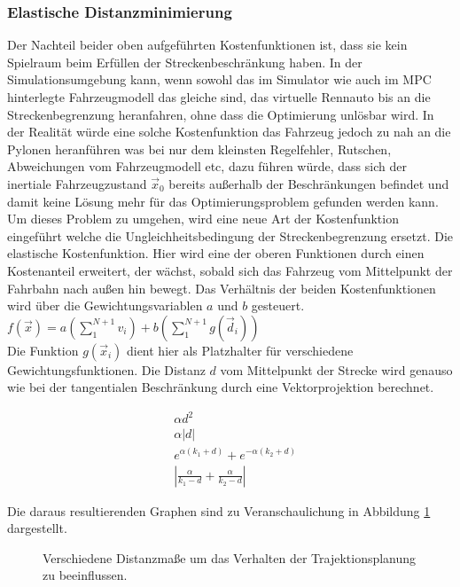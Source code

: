 \documentclass{like}
\begin{document}
\subsubsection*{Elastische Distanzminimierung}
Der Nachteil beider oben aufgeführten Kostenfunktionen ist, dass sie kein Spielraum beim Erfüllen der Streckenbeschränkung haben. In der Simulationsumgebung kann, wenn sowohl das im Simulator wie auch im \ac{MPC} hinterlegte Fahrzeugmodell das gleiche sind, das virtuelle Rennauto bis an die Streckenbegrenzung heranfahren, ohne dass die Optimierung unlösbar wird. In der Realität würde eine solche Kostenfunktion das Fahrzeug jedoch zu nah an die Pylonen heranführen was bei nur dem kleinsten Regelfehler, Rutschen, Abweichungen vom Fahrzeugmodell etc, dazu führen würde, dass sich der inertiale Fahrzeugzustand $\vec{x}_0$ bereits außerhalb der Beschränkungen befindet und damit keine Lösung mehr für das Optimierungsproblem gefunden werden kann. Um dieses Problem zu umgehen, wird eine neue Art der Kostenfunktion eingeführt welche die Ungleichheitsbedingung der Streckenbegrenzung ersetzt. Die elastische Kostenfunktion. Hier wird eine der oberen Funktionen durch einen Kostenanteil erweitert, der wächst, sobald sich das Fahrzeug vom Mittelpunkt der Fahrbahn nach außen hin bewegt. Das Verhältnis der beiden Kostenfunktionen wird über die Gewichtungsvariablen \(a\) und \(b\) gesteuert.\\
$f(\vec{x}) = a (\sum_{1}^{N+1} v_i) + b(\sum_{1}^{N+1} g(\vec{d}_i))$  \\
Die Funktion $g(\vec{x}_i)$ dient hier als Platzhalter für verschiedene Gewichtungsfunktionen. Die Distanz \(d\) vom Mittelpunkt der Strecke wird genauso wie bei der tangentialen Beschränkung durch eine Vektorprojektion berechnet.

\begin{eqnarray}
	&\alpha d^2 \\
	&\alpha |d|\\
	&e^{\alpha (k_1 + d)} + e^{-\alpha(k_2 + d)} \label{eq:distMeasure1}\\
	&|\frac{\alpha}{k_1-d} + \frac{\alpha}{k_2 - d}| \label{eq:distMeasure2}
\end{eqnarray}

Die daraus resultierenden Graphen sind zu Veranschaulichung in Abbildung \ref{fig:elasticCost} dargestellt.

\begin{figure}[ht!]
	\centering
	 
	\caption{Verschiedene Distanzmaße um das Verhalten der Trajektionsplanung zu beeinflussen.}
	\label{fig:elasticCost}
\end{figure}
\end{document}
